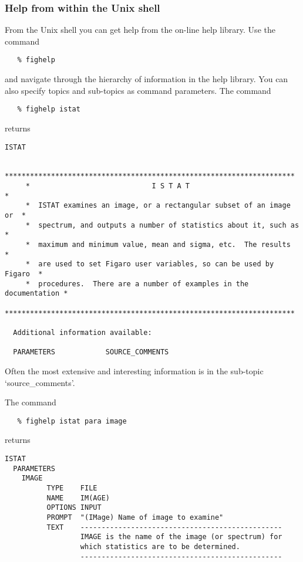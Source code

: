 
\subsubsection{\label{gethelpunix}Help from within the Unix shell}

   From the Unix shell you can get help from the on-line help library.
   Use the command

\begin{verbatim}
   % fighelp
\end{verbatim}

   and navigate through the hierarchy of information in the help
   library. You can also specify topics and sub-topics as command
   parameters. The command

\begin{verbatim}
   % fighelp istat
\end{verbatim}

   returns

{\samepage
\begin{verbatim}
ISTAT

     *********************************************************************
     *                             I S T A T                             *
     *  ISTAT examines an image, or a rectangular subset of an image or  *
     *  spectrum, and outputs a number of statistics about it, such as   *
     *  maximum and minimum value, mean and sigma, etc.  The results     *
     *  are used to set Figaro user variables, so can be used by Figaro  *
     *  procedures.  There are a number of examples in the documentation *
     *********************************************************************

  Additional information available:

  PARAMETERS            SOURCE_COMMENTS
\end{verbatim}
}

   Often the most extensive and interesting information is in the
   sub-topic `source\_comments'.

   The command

\begin{verbatim}
   % fighelp istat para image
\end{verbatim}

   returns

\begin{verbatim}
ISTAT
  PARAMETERS
    IMAGE
          TYPE    FILE
          NAME    IM(AGE)
          OPTIONS INPUT
          PROMPT  "(IMage) Name of image to examine"
          TEXT    ------------------------------------------------
                  IMAGE is the name of the image (or spectrum) for
                  which statistics are to be determined.
                  ------------------------------------------------
\end{verbatim}

